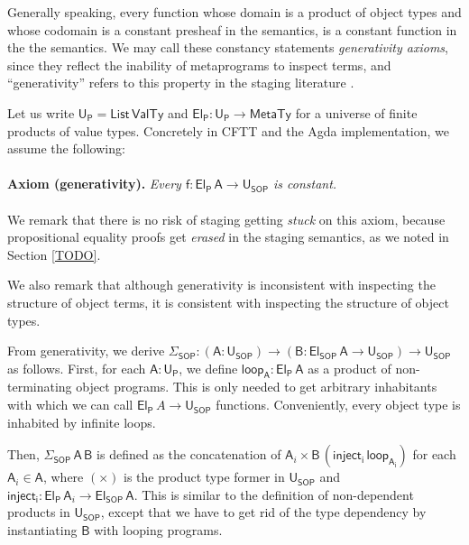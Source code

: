 \documentclass[acmsmall,screen,review,anonymous]{acmart}
\newcommand{\msf}[1]{{\mathsf{#1}}}
\newcommand{\vA}{\mathsf{A}}
\newcommand{\vB}{\mathsf{B}}
\newcommand{\vf}{\mathsf{f}}
\newcommand{\SOP}{\msf{SOP}}
\newcommand{\El}{\msf{El}}
\newcommand{\USOP}{\msf{U}_{\msf{SOP}}}
\newcommand{\Uprod}{\msf{U_P}}
\newcommand{\Elprod}{\msf{El_{P}}}
\newcommand{\List}{\msf{List}}
\newcommand{\MTy}{\msf{MetaTy}}
\newcommand{\VTy}{\msf{ValTy}}
\theoremstyle{remark}
\begin{document}
Generally speaking, every function whose domain is a product of object types and
whose codomain is a constant presheaf in the semantics, is a constant function
in the the semantics. We may call these constancy statements \emph{generativity
axioms}, since they reflect the inability of metaprograms to inspect terms, and
``generativity'' refers to this property in the staging literature \cite{TODO}.

Let us write $\Uprod = \List\,\VTy$ and $\Elprod : \Uprod \to \MTy$ for a
universe of finite products of value types. Concretely in CFTT and the Agda
implementation, we assume the following:
\\\\
\noindent \textbf{Axiom (generativity).}\textit{ Every $\vf : \Elprod\,\vA \to \USOP$ is constant. }
\\\\
We remark that there is no risk of staging getting \emph{stuck} on this axiom,
because propositional equality proofs get \emph{erased} in the staging semantics,
as we noted in Section \ref{TODO}.

We also remark that although generativity is inconsistent with inspecting the
structure of object terms, it is consistent with inspecting the structure of
object types.

From generativity, we derive $\Sigma_\SOP : (\vA : \USOP) \to (\vB : \El_\SOP\,\vA \to \USOP)
\to \USOP$ as follows. First, for each $\vA : \Uprod$, we define $\msf{loop_{\vA}} :
\Elprod\,\vA$ as a product of non-terminating object programs. This is only needed
to get arbitrary inhabitants with which we can call $\Elprod\,A \to \USOP$
functions. Conveniently, every object type is inhabited by infinite loops.

Then, $\Sigma_\SOP\,\vA\,\vB$ is defined as the concatenation of $\vA_i \times
\vB\,(\msf{inject_i}\,\msf{loop_{\vA_i}})$ for each $\vA_i \in \vA$, where
$({\times})$ is the product type former in $\USOP$ and $\msf{inject_i} :
\Elprod\,\vA_i \to \El_\SOP\,\vA$. This is similar to the definition of
non-dependent products in $\USOP$, except that we have to get rid of the type
dependency by instantiating $\vB$ with looping programs.
\end{document}

